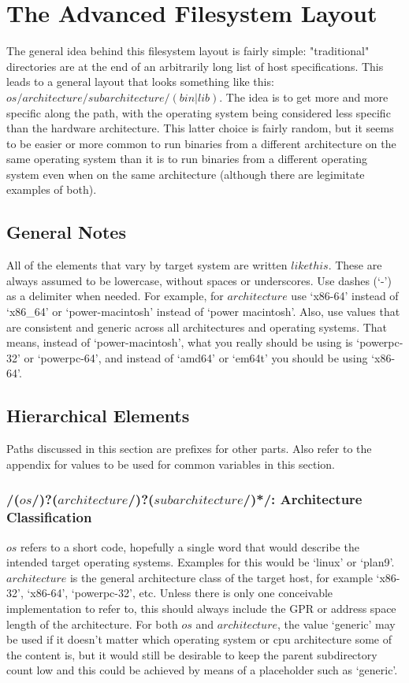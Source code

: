 \documentclass[a4paper,twoside,titlepage]{article}
\begin{document}
\newpage

\section{The Advanced Filesystem Layout}
The general idea behind this filesystem layout is fairly simple: "traditional"
directories are at the end of an arbitrarily long list of host specifications.
This leads to a general layout that looks something like this:
$os/architecture/subarchitecture/(bin|lib)$. The idea is to get more and more
specific along the path, with the operating system being considered less
specific than the hardware architecture. This latter choice is fairly random,
but it seems to be easier or more common to run binaries from a different
architecture on the same operating system than it is to run binaries from a
different operating system even when on the same architecture (although there
are legimitate examples of both).

\subsection{General Notes}
All of the elements that vary by target system are written $like this$. These
are always assumed to be lowercase, without spaces or underscores. Use dashes
(`-') as a delimiter when needed. For example, for $architecture$ use `x86-64'
instead of `x86\_64' or `power-macintosh' instead of `power macintosh'. Also,
use values that are consistent and generic across all architectures and
operating systems. That means, instead of `power-macintosh', what you really
should be using is `powerpc-32' or `powerpc-64', and instead of `amd64' or
`em64t' you should be using `x86-64'.

\subsection{Hierarchical Elements}
Paths discussed in this section are prefixes for other parts. Also refer to the
appendix for values to be used for common variables in this section.

\subsubsection{/($os$/)?($architecture$/)?($subarchitecture$/)*/: Architecture
Classification}
$os$ refers to a short code, hopefully a single word that would describe the
intended target operating systems. Examples for this would be `linux' or
`plan9'. $architecture$ is the general architecture class of the target host,
for example `x86-32', `x86-64', `powerpc-32', etc. Unless there is only one
conceivable implementation to refer to, this should always include the GPR or
address space length of the architecture. For both $os$ and $architecture$, the
value `generic' may be used if it doesn't matter which operating system or cpu
architecture some of the content is, but it would still be desirable to keep the
parent subdirectory count low and this could be achieved by means of a
placeholder such as `generic'.
\end{document}
